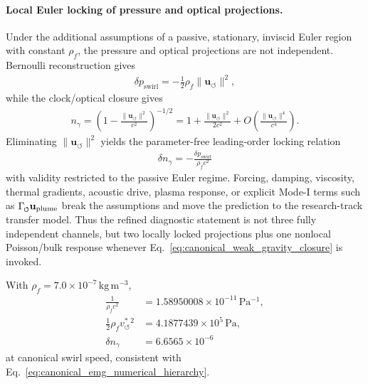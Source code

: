 \documentclass[11pt]{article}
\theoremstyle{definition}
\theoremstyle{plain}
\theoremstyle{remark}
\newcommand{\swirlarrow}{\mathchoice{\mkern-2mu\scriptstyle\boldsymbol{\circlearrowleft}}{\mkern-2mu\scriptstyle\boldsymbol{\circlearrowleft}}{\mkern-2mu\scriptscriptstyle\boldsymbol{\circlearrowleft}}{\mkern-2mu\scriptscriptstyle\boldsymbol{\circlearrowleft}}}
\newcommand{\rhoF}{{\rho_{\!f}}}
\newcommand{\vchar}{v_{\!\boldsymbol{\circlearrowleft}}^{\ast}}
\newcommand{\uswirl}{\mathbf{u}_{\!\boldsymbol{\circlearrowleft}}}
\begin{document}
        \paragraph{Local Euler locking of pressure and optical projections.}
        Under the additional assumptions of a passive, stationary, inviscid Euler
        region with constant \(\rhoF\), the pressure and optical projections are not
        independent.  Bernoulli reconstruction gives
        \begin{align}
            \delta p_{\mathrm{swirl}}
            =
            -\frac{1}{2}\rhoF\lVert\uswirl\rVert^2,
        \end{align}
        while the clock/optical closure gives
        \begin{align}
            n_\gamma
            =
            \left(
                1-\frac{\lVert\uswirl\rVert^2}{c^2}
            \right)^{-1/2}
            =
            1+\frac{\lVert\uswirl\rVert^2}{2c^2}
            +O\!\left(\frac{\lVert\uswirl\rVert^4}{c^4}\right).
        \end{align}
        Eliminating \(\lVert\uswirl\rVert^2\) yields the parameter-free leading-order
        locking relation
        \begin{align}
            \boxed{
            \delta n_\gamma
            =
            -\frac{\delta p_{\mathrm{swirl}}}{\rhoF c^2}
            }
            \label{eq:canonical_pressure_optical_locking}
        \end{align}
        with validity restricted to the passive Euler regime.  Forcing, damping,
        viscosity, thermal gradients, acoustic drive, plasma response, or explicit
        Mode-I terms such as \(\Gamma_{\swirlarrow}\mathbf{u}_{\mathrm{plume}}\)
        break the assumptions and move the prediction to the research-track transfer
        model.  Thus the refined diagnostic statement is not three fully independent
        channels, but two locally locked projections plus one nonlocal Poisson/bulk
        response whenever Eq.~\eqref{eq:canonical_weak_gravity_closure} is invoked.

        With \(\rhoF=7.0\times10^{-7}\,\mathrm{kg\,m^{-3}}\),
        \begin{align}
            \frac{1}{\rhoF c^2}
            &=
            1.58950008\times10^{-11}\,\mathrm{Pa^{-1}},
            \\
            \frac{1}{2}\rhoF\vchar^2
            &=
            4.1877439\times10^5\,\mathrm{Pa},
            \\
            \delta n_\gamma
            &=
            6.6565\times10^{-6}
        \end{align}
        at canonical swirl speed, consistent with Eq.~\eqref{eq:canonical_emg_numerical_hierarchy}.
\end{document}
